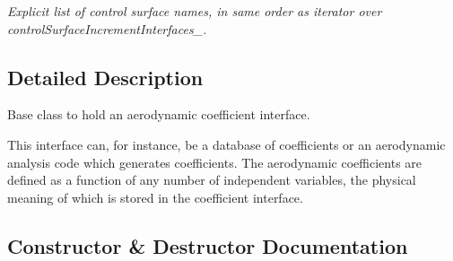 \begin{DoxyCompactItemize}
\begin{DoxyCompactList}\small\item\em Explicit list of control surface names, in same order as iterator over control\+Surface\+Increment\+Interfaces\+\_\+. \end{DoxyCompactList}\end{DoxyCompactItemize}


\subsection{Detailed Description}
Base class to hold an aerodynamic coefficient interface. 

This interface can, for instance, be a database of coefficients or an aerodynamic analysis code which generates coefficients. The aerodynamic coefficients are defined as a function of any number of independent variables, the physical meaning of which is stored in the coefficient interface. 

\subsection{Constructor \& Destructor Documentation}
